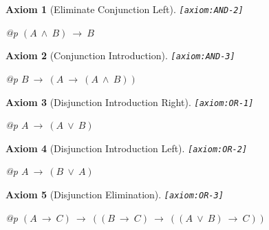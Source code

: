 \documentclass[a4paper,german,10pt,twoside]{book}
\newtheorem{ax}{Axiom}
\theoremstyle{definition}
\theoremstyle{remark}
\begin{document}
\begin{ax}[Eliminate Conjunction Left]
\label{axiom:AND-2} \hypertarget{axiom:AND-2}{}
{\tt \tiny [\verb]axiom:AND-2]]}
\mbox{}
\begin{longtable}{{@{\extracolsep{\fill}}p{\linewidth}}}
\centering $(A\ \land\ B)\ \rightarrow\ B$
\end{longtable}

\end{ax}


\begin{ax}[Conjunction Introduction]
\label{axiom:AND-3} \hypertarget{axiom:AND-3}{}
{\tt \tiny [\verb]axiom:AND-3]]}
\mbox{}
\begin{longtable}{{@{\extracolsep{\fill}}p{\linewidth}}}
\centering $B\ \rightarrow\ (A\ \rightarrow\ (A\ \land\ B))$
\end{longtable}

\end{ax}


\begin{ax}[Disjunction Introduction Right]
\label{axiom:OR-1} \hypertarget{axiom:OR-1}{}
{\tt \tiny [\verb]axiom:OR-1]]}
\mbox{}
\begin{longtable}{{@{\extracolsep{\fill}}p{\linewidth}}}
\centering $A\ \rightarrow\ (A\ \lor\ B)$
\end{longtable}

\end{ax}


\begin{ax}[Disjunction Introduction Left]
\label{axiom:OR-2} \hypertarget{axiom:OR-2}{}
{\tt \tiny [\verb]axiom:OR-2]]}
\mbox{}
\begin{longtable}{{@{\extracolsep{\fill}}p{\linewidth}}}
\centering $A\ \rightarrow\ (B\ \lor\ A)$
\end{longtable}

\end{ax}


\begin{ax}[Disjunction Elimination]
\label{axiom:OR-3} \hypertarget{axiom:OR-3}{}
{\tt \tiny [\verb]axiom:OR-3]]}
\mbox{}
\begin{longtable}{{@{\extracolsep{\fill}}p{\linewidth}}}
\centering $(A\ \rightarrow\ C)\ \rightarrow\ ((B\ \rightarrow\ C)\ \rightarrow\ ((A\ \lor\ B)\ \rightarrow\ C))$
\end{longtable}

\end{ax}
\end{document}
